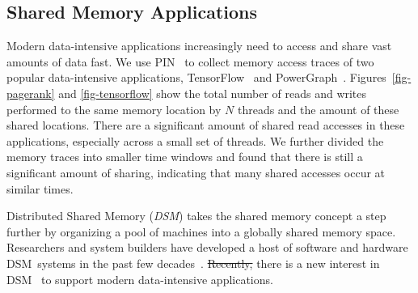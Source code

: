 \documentclass[sigconf]{acmart}
\renewcommand{\em}{\it}
\newcommand{\dsm}{DSM}
\providecommand{\DIFadd}[1]{{\protect\color{blue}\uwave{#1}}} %
\providecommand{\DIFdel}[1]{{\protect\color{red}\sout{#1}}}                      %
\providecommand{\DIFaddbegin}{} %
\providecommand{\DIFaddend}{} %
\providecommand{\DIFdelbegin}{} %
\providecommand{\DIFdelend}{} %
\begin{document}
\DIFdelbegin %
\DIFdelend \subsection{Shared Memory Applications}
\DIFdelbegin %
\DIFdelend Modern data-intensive applications increasingly need
to access and share vast amounts of data fast. 
We use PIN~\cite{Luk05-PLDI} to collect memory access traces of two popular data-intensive applications, 
TensorFlow~\cite{TensorFlow} and PowerGraph~\cite{Gonzalez12-OSDI}.
Figures~\ref{fig-pagerank} and \ref{fig-tensorflow} show the total number of reads and writes performed to the same memory location 
by $N$ threads and the amount of these shared locations.
There are a significant amount of shared read accesses in these applications,
especially across a small set of threads.
We further divided the memory traces into smaller time windows 
and found that there is still a significant amount of sharing, 
indicating that many shared accesses occur at similar times. 

Distributed Shared Memory ({\em \dsm}) takes the shared memory concept a step further 
by organizing a pool of machines into a globally shared memory space.
Researchers and system builders have developed a host of software and hardware \dsm\ systems in the past few 
decades~\cite{Bennett90-PPOPP,Bisiani90-ISCA,Black89-COMPCON,Delp:1988:AIM:59505,Fleisch89-SOSP,Gibbons91-SPAA,Kontothanassis97-ISCA,Lo94-AC,Kessler89-ACM,Stumm90-IEEE,Keleher92-ISCA,Ramachandran91-Wiley,Zhou92-IEEE,Zhou92-IEEE,Stumm90-IEEE,Stumm90-IPDPS,HLRC,Shasta}.
\DIFdelbegin \DIFdel{Recently, %
}\DIFdelend \DIFaddbegin \DIFadd{Recently, }\DIFaddend there is a new interest in \dsm~\cite{Nelson15-ATC} to support modern data-intensive applications.
\end{document}
